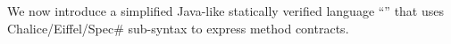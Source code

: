 
We now introduce a simplified Java-like statically verified language “\svl” that uses Chalice/Eiffel/Spec\# %
sub-syntax to express method contracts.


